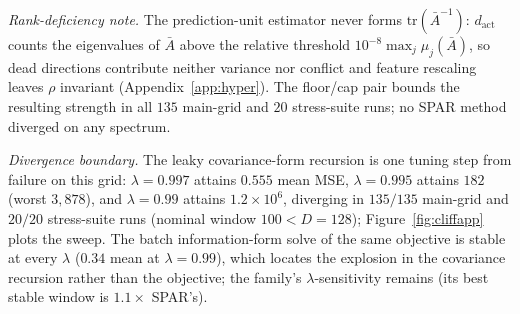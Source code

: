\documentclass[11pt]{article}
\begin{document}
\emph{Rank-deficiency note.}
The prediction-unit estimator never forms $\mathrm{tr}(\bar A^{-1})$: $d_{\mathrm{act}}$ counts the eigenvalues of $\bar A$ above the relative threshold $10^{-8}\max_j\mu_j(\bar A)$, so dead directions contribute neither variance nor conflict and feature rescaling leaves $\rho$ invariant (Appendix~\ref{app:hyper}).
The floor/cap pair bounds the resulting strength in all $135$ main-grid and $20$ stress-suite runs; no SPAR method diverged on any spectrum.

\emph{Divergence boundary.}
The leaky covariance-form recursion is one tuning step from failure on this grid: $\lambda = 0.997$ attains $0.555$ mean MSE, $\lambda = 0.995$ attains $182$ (worst $3{,}878$), and $\lambda = 0.99$ attains $1.2 \times 10^6$, diverging in $135/135$ main-grid and $20/20$ stress-suite runs (nominal window $100 < D = 128$); Figure~\ref{fig:cliffapp} plots the sweep.
The batch information-form solve of the same objective is stable at every $\lambda$ ($0.34$ mean at $\lambda = 0.99$), which locates the explosion in the covariance recursion rather than the objective; the family's $\lambda$-sensitivity remains (its best stable window is $1.1\times$ SPAR's).
\end{document}
